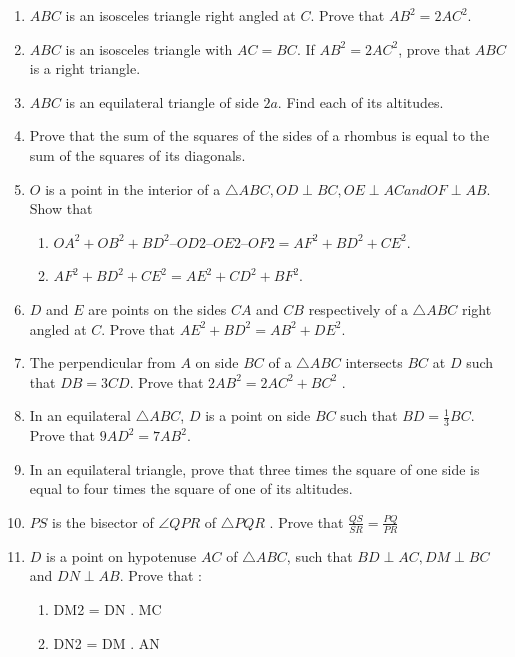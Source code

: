 \begin{enumerate}[label=\arabic*.,ref=\thesubsection.\theenumi]
\begin{enumerate}
\end{enumerate}
\item  $ABC$ is an isosceles triangle right angled at $C$. Prove that $AB^2= 2 AC^2$.
 \item  $ABC$ is an isosceles triangle with $AC = BC$. If $AB^2=2 AC^2$, prove that $ABC$ is a right triangle.
\item  $ABC$ is an equilateral triangle of side $2a$. Find each of its altitudes. 
\item  Prove that the sum of the squares of the sides of a rhombus is equal to the sum of the squares of its diagonals.
\item  $O$ is a point in the interior of a $\triangle ABC, OD  \perp  BC, OE  \perp  AC and OF  \perp  AB$. Show that
%
\begin{enumerate}
\item  $OA^2 + OB^2 + BD^2 – OD2 – OE2– OF2 = AF^2 + BD^2 + CE^2$.
\item  $AF^2 + BD^2 +CE^2 = AE^2 + CD^2 + BF^2$.
\end{enumerate}
\item  $D$ and $E$ are points on the sides $CA$ and $CB$ respectively of a $\triangle ABC$ right angled at $C$. Prove that $AE^2+ BD^2 = AB^2 + DE^2$.
\item  The perpendicular from $A$ on side $BC$ of a  $\triangle  ABC$ intersects $BC$ at $D$ such that $DB = 3 CD$. Prove that $2 AB^2= 2 AC^2 + BC^2$ .
\item  In an equilateral $\triangle ABC$, $D$ is a point on side $BC$ such that $BD = \frac{1}{3} BC$.  Prove that $9 AD^2= 7 AB^2$.
\item  In an equilateral triangle, prove that three times the square of one side is equal to four times the square of one of its altitudes.
\item  $PS$ is the bisector of  $\angle  QPR$ of  $\triangle PQR$ . Prove that
$\frac{QS}{SR} = \frac{PQ}{PR}$
\item $D$ is a point on hypotenuse $AC$ of  $\triangle  ABC$, such that $BD  \perp  AC, DM  \perp  BC$ and $DN  \perp  AB$. Prove that :
\begin{enumerate}
\item  DM2 = DN . MC  
 \item  DN2 = DM . AN
\end{enumerate}


\end{enumerate}
